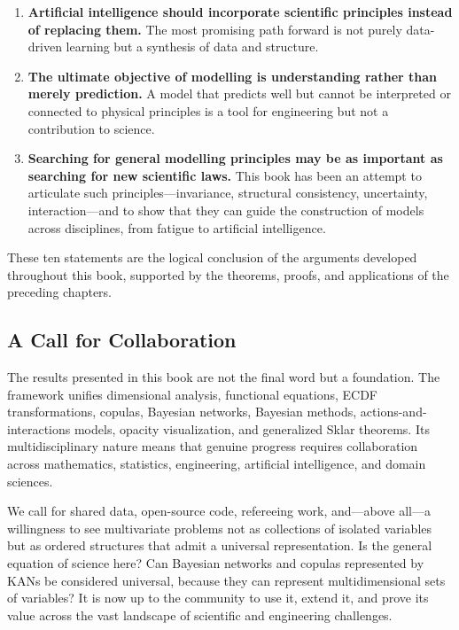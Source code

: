 \begin{enumerate}
\item \textbf{Artificial intelligence should incorporate scientific principles instead of replacing them.} The most promising path forward is not purely data-driven learning but a synthesis of data and structure.

\item \textbf{The ultimate objective of modelling is understanding rather than merely prediction.} A model that predicts well but cannot be interpreted or connected to physical principles is a tool for engineering but not a contribution to science.

\item \textbf{Searching for general modelling principles may be as important as searching for new scientific laws.} This book has been an attempt to articulate such principles—invariance, structural consistency, uncertainty, interaction—and to show that they can guide the construction of models across disciplines, from fatigue to artificial intelligence.

\end{enumerate}

These ten statements are the logical conclusion of the arguments developed throughout this book, supported by the theorems, proofs, and applications of the preceding chapters.

\subsection{A Call for Collaboration}

The results presented in this book are not the final word but a foundation. The framework unifies dimensional analysis, functional equations, ECDF transformations, copulas, Bayesian networks, Bayesian methods, actions-and-interactions models, opacity visualization, and generalized Sklar theorems. Its multidisciplinary nature means that genuine progress requires collaboration across mathematics, statistics, engineering, artificial intelligence, and domain sciences.

We call for shared data, open-source code, refereeing work, and—above all—a willingness to see multivariate problems not as collections of isolated variables but as ordered structures that admit a universal representation. Is the general equation of science here? Can Bayesian networks and copulas represented by KANs be considered universal, because they can represent multidimensional sets of variables? It is now up to the community to use it, extend it, and prove its value across the vast landscape of scientific and engineering challenges.

